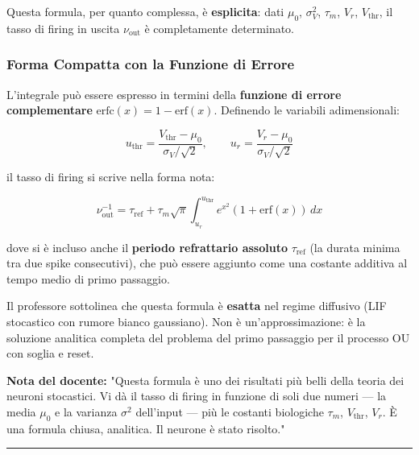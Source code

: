 Questa formula, per quanto complessa, è \textbf{esplicita}: dati $\mu_0$, $\sigma_V^2$, $\tau_m$, $V_r$, $V_{\text{thr}}$, il tasso di firing in uscita $\nu_{\text{out}}$ è completamente determinato.

\subsubsection{Forma Compatta con la Funzione di Errore}

L'integrale può essere espresso in termini della \textbf{funzione di errore complementare} $\text{erfc}(x) = 1 - \text{erf}(x)$. Definendo le variabili adimensionali:

\begin{equation}
u_{\text{thr}} = \frac{V_{\text{thr}} - \mu_0}{\sigma_V / \sqrt{2}}, \qquad u_r = \frac{V_r - \mu_0}{\sigma_V / \sqrt{2}}
\end{equation}

il tasso di firing si scrive nella forma nota:

\begin{equation}
\nu_{\text{out}}^{-1} = \tau_{\text{ref}} + \tau_m \sqrt{\pi} \int_{u_r}^{u_{\text{thr}}} e^{x^2}\left(1 + \text{erf}(x)\right)\, dx
\end{equation}

dove si è incluso anche il \textbf{periodo refrattario assoluto} $\tau_{\text{ref}}$ (la durata minima tra due spike consecutivi), che può essere aggiunto come una costante additiva al tempo medio di primo passaggio.

Il professore sottolinea che questa formula è \textbf{esatta} nel regime diffusivo (LIF stocastico con rumore bianco gaussiano). Non è un'approssimazione: è la soluzione analitica completa del problema del primo passaggio per il processo OU con soglia e reset.

\begin{tcolorbox}[colback=gray!5, colframe=gray!40, arc=2mm, boxrule=0.5pt]
\textbf{Nota del docente:} "Questa formula è uno dei risultati più belli della teoria dei neuroni stocastici. Vi dà il tasso di firing in funzione di soli due numeri — la media $\mu_0$ e la varianza $\sigma^2$ dell'input — più le costanti biologiche $\tau_m$, $V_{\text{thr}}$, $V_r$. È una formula chiusa, analitica. Il neurone è stato risolto."
\end{tcolorbox}

\vspace{0.5cm}
\noindent\rule{\textwidth}{0.4pt}
\vspace{0.5cm}

